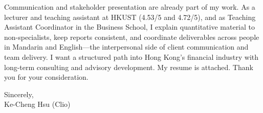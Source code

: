 \documentclass[11pt,letterpaper]{article}
\begin{document}
Communication and stakeholder presentation are already part of my work. As a lecturer and teaching assistant at HKUST (4.53/5 and 4.72/5), and as Teaching Assistant Coordinator in the Business School, I explain quantitative material to non-specialists, keep reports consistent, and coordinate deliverables across people in Mandarin and English---the interpersonal side of client communication and team delivery. I want a structured path into Hong Kong's financial industry with long-term consulting and advisory development. My resume is attached. Thank you for your consideration.

\vspace{0.3em}
Sincerely,\\[0.25em]
Ke-Cheng Hsu (Clio)
\end{document}
